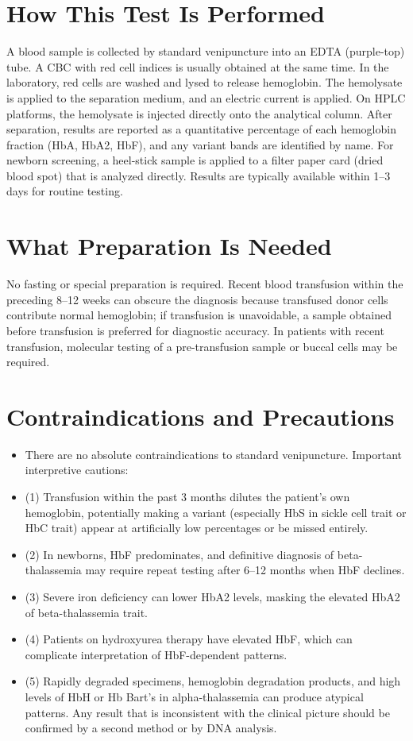 \section*{How This Test Is Performed}
A blood sample is collected by standard venipuncture into an EDTA (purple-top) tube. A CBC with red cell indices is usually obtained at the same time. In the laboratory, red cells are washed and lysed to release hemoglobin. The hemolysate is applied to the separation medium, and an electric current is applied. On HPLC platforms, the hemolysate is injected directly onto the analytical column. After separation, results are reported as a quantitative percentage of each hemoglobin fraction (HbA, HbA2, HbF), and any variant bands are identified by name. For newborn screening, a heel-stick sample is applied to a filter paper card (dried blood spot) that is analyzed directly. Results are typically available within 1--3 days for routine testing.

\section*{What Preparation Is Needed}
No fasting or special preparation is required. Recent blood transfusion within the preceding 8--12 weeks can obscure the diagnosis because transfused donor cells contribute normal hemoglobin; if transfusion is unavoidable, a sample obtained before transfusion is preferred for diagnostic accuracy. In patients with recent transfusion, molecular testing of a pre-transfusion sample or buccal cells may be required.

\section*{Contraindications and Precautions}
\begin{itemize}
  \item There are no absolute contraindications to standard venipuncture. Important interpretive cautions:
  \item (1) Transfusion within the past 3 months dilutes the patient's own hemoglobin, potentially making a variant (especially HbS in sickle cell trait or HbC trait) appear at artificially low percentages or be missed entirely.
  \item (2) In newborns, HbF predominates, and definitive diagnosis of beta-thalassemia may require repeat testing after 6--12 months when HbF declines.
  \item (3) Severe iron deficiency can lower HbA2 levels, masking the elevated HbA2 of beta-thalassemia trait.
  \item (4) Patients on hydroxyurea therapy have elevated HbF, which can complicate interpretation of HbF-dependent patterns.
  \item (5) Rapidly degraded specimens, hemoglobin degradation products, and high levels of HbH or Hb Bart's in alpha-thalassemia can produce atypical patterns. Any result that is inconsistent with the clinical picture should be confirmed by a second method or by DNA analysis.
\end{itemize}
